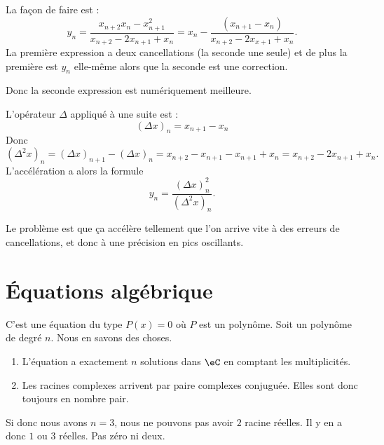 La façon de faire est :
\begin{equation}
	y_n=\frac{ x_{n+2}x_n-x_{n+1}^2 }{ x_{n+2}-2x_{n+1}+x_n }=x_n-\frac{ (x_{n+1}-x_n) }{ x_{n+2}-2x_{x+1}+x_n }.
\end{equation}
La première expression a deux cancellations (la seconde une seule) et de plus la première est \( y_n\) elle-même alors que la seconde est une correction.

Donc la seconde expression est numériquement meilleure.

L'opérateur \( \Delta\) appliqué à une suite est :
\begin{equation}
	(\Delta x)_n=x_{n+1}-x_n
\end{equation}
Donc
\begin{equation}
	(\Delta^2x)_n= (\Delta x)_{n+1}-(\Delta x)_n=x_{n+2}-x_{n+1}-x_{n+1}+x_n=x_{n+2}-2x_{n+1}+x_n.
\end{equation}
L'accélération a alors la formule
\begin{equation}
	y_n=\frac{ (\Delta x)_n^2 }{ (\Delta^2x)_n }.
\end{equation}

Le problème est que ça accélère tellement que l'on arrive vite à des erreurs de cancellations, et donc à une précision en pics oscillants.

\section{Équations algébrique}

C'est une équation du type \( P(x)=0\) où \( P\) est un polynôme. Soit un polynôme de degré \( n\). Nous en savons des choses.

\begin{enumerate}
	\item
	      L'équation a exactement \( n\) solutions dans \( \eC\) en comptant les multiplicités.
	\item
	      Les racines complexes arrivent par paire complexes conjuguée. Elles sont donc toujours en nombre pair.
\end{enumerate}

Si donc nous avons \( n=3\), nous ne pouvons pas avoir \( 2\) racine réelles. Il y en a donc \( 1\) ou \( 3\) réelles. Pas zéro ni deux.

